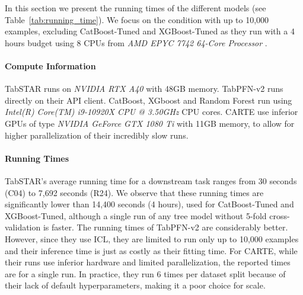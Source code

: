 In this section we present the running times of the different models (see Table~\ref{tab:running_time}). We focus on the condition with up to 10,000 examples, excluding CatBoost-Tuned and XGBoost-Tuned as they run with a 4 hours budget using 8 CPUs from \textit{AMD EPYC 7742 64-Core Processor} .

\paragraph{Compute Information} TabSTAR runs on \textit{NVIDIA RTX A40} with 48GB memory. TabPFN-v2 runs directly on their API client. CatBoost, XGboost and Random Forest run using \textit{Intel(R) Core(TM) i9-10920X CPU @ 3.50GHz} CPU cores. CARTE use inferior GPUs of type \textit{NVIDIA GeForce GTX 1080 Ti} with 11GB memory, to allow for higher parallelization of their incredibly slow runs. 

\paragraph{Running Times} TabSTAR's average running time for a downstream task ranges from 30 seconds (C04) to 7,692 seconds (R24). We observe that these running times are significantly lower than 14,400 seconds (4 hours), used for CatBoost-Tuned and XGBoost-Tuned, although a single run of any tree model without 5-fold cross-validation is faster. The running times of TabPFN-v2 are considerably better. However, since they use ICL, they are limited to run only up to 10,000 examples and their inference time is just as costly as their fitting time. For CARTE, while their runs use inferior hardware and limited parallelization, the reported times are for a single run. In practice, they run 6 times per dataset split because of their lack of default hyperparameters, making it a poor choice for scale.

